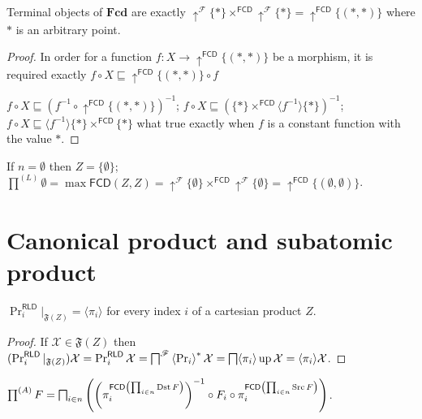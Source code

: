 \begin{prop}
  Terminal objects of $\mathbf{Fcd}$ are exactly
  $\uparrow^{\mathscr{F}} \{ \ast \} \times^{\mathsf{FCD}}
  \uparrow^{\mathscr{F}} \{ \ast \} = \uparrow^{\mathsf{FCD}} \{ (\ast
  , \ast) \}$ where $\ast$ is an arbitrary point.
\end{prop}

\begin{proof}
  In order for a function $f : X \rightarrow \uparrow^{\mathsf{FCD}} \{
  (\ast , \ast) \}$ be a morphism, it is required exactly $f \circ X
  \sqsubseteq \uparrow^{\mathsf{FCD}} \{ (\ast , \ast) \} \circ f$
  
  $f \circ X \sqsubseteq (f^{- 1} \circ \uparrow^{\mathsf{FCD}} \{
  (\ast , \ast) \})^{- 1}$; $f \circ X \sqsubseteq (\{ \ast \}
  \times^{\mathsf{FCD}} \langle f^{- 1} \rangle \{ \ast \})^{- 1}$; $f
  \circ X \sqsubseteq \langle f^{- 1} \rangle \{ \ast \}
  \times^{\mathsf{FCD}} \{ \ast \}$ what true exactly when $f$ is a
  constant function with the value $\ast$.
\end{proof}

If $n = \emptyset$ then $Z = \{ \emptyset \}$; $\prod^{(L)} \emptyset = \max
\mathsf{FCD} (Z , Z) = \uparrow^{\mathscr{F}} \{ \emptyset \}
\times^{\mathsf{FCD}} \uparrow^{\mathscr{F}} \{ \emptyset \} =
\uparrow^{\mathsf{FCD}} \{ (\emptyset , \emptyset) \}$.


\section{Canonical product and subatomic product}


\begin{prop}
  $\Pr^{\mathsf{RLD}}_i |_{\mathfrak{F} (Z)} = \langle \pi_i \rangle$
  for every index $i$ of a cartesian product $Z$.
\end{prop}

\begin{proof}
  If $\mathcal{X} \in \mathfrak{F} (Z)$ then $(\Pr^{\mathsf{RLD}}_i
  |_{\mathfrak{F} (Z)}) \mathcal{X} = \Pr^{\mathsf{RLD}}_i  \mathcal{X}
  = \bigsqcap^{\mathscr{F}} \left\langle \Pr_i\right\rangle ^{\ast} \mathcal{X} =
  \bigsqcap \langle \pi_i \rangle \operatorname{up} \mathcal{X} = \langle \pi_i
  \rangle \mathcal{X}$.
\end{proof}

\begin{prop}
  $\prod^{(A)} F = \bigsqcap_{i \in n} \left( \left( \pi^{\mathsf{FCD}
  \left( \prod_{i \in n} \operatorname{Dst} F \right)}_i \right)^{- 1} \circ F_i \circ
  \pi^{\mathsf{FCD} \left( \prod_{i \in n} \operatorname{Src} F \right)}_i
  \right)$.
\end{prop}

